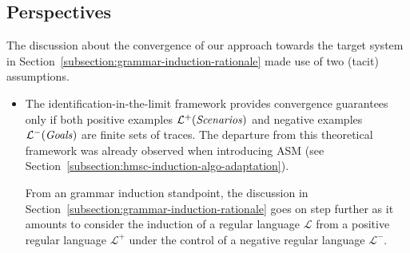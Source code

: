 \subsection{Perspectives}

The discussion about the convergence of our approach towards the target system in Section~\ref{subsection:grammar-induction-rationale} made use of two (tacit) assumptions.
\begin{itemize}
\item The identification-in-the-limit framework provides convergence guarantees only if both positive examples $\mathcal{L}^+(\mbox{\emph{Scenarios}})$ and negative examples $\mathcal{L}^-(\mbox{\emph{Goals}})$ are finite sets of traces. The departure from this theoretical framework was already observed when introducing ASM (see Section~\ref{subsection:hmsc-induction-algo-adaptation}). 

From an grammar induction standpoint, the discussion in Section~\ref{subsection:grammar-induction-rationale} goes on step further as it amounts to consider the induction of a regular language $\mathcal{L}$ from a positive regular language $\mathcal{L}^+$ under the control of a negative regular language $\mathcal{L}^-$.
\end{itemize}



